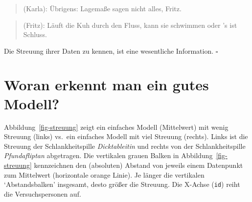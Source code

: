 \documentclass[
  letterpaper,
  twoside,
  open=any]{scrbook}
\theoremstyle{definition}
\theoremstyle{definition}
\theoremstyle{definition}
\theoremstyle{remark}
\begin{document}
\begin{quote}
{} (Karla): Übrigens: Lagemaße sagen nicht alles,
Fritz.
\end{quote}

\begin{quote}
{} (Fritz): Läuft die Kuh durch den Fluss, kann sie
schwimmen oder 's ist Schluss.
\end{quote}

\begin{tcolorbox}[enhanced jigsaw, colframe=quarto-callout-important-color-frame, arc=.35mm, leftrule=.75mm, bottomtitle=1mm, titlerule=0mm, colbacktitle=quarto-callout-important-color!10!white, breakable, bottomrule=.15mm, colback=white, left=2mm, rightrule=.15mm, opacityback=0, toptitle=1mm, toprule=.15mm, opacitybacktitle=0.6, title=\textcolor{quarto-callout-important-color}{\faExclamation}\hspace{0.5em}{Wichtig}, coltitle=black]

Die Streuung ihrer Daten zu kennen, ist eine wesentliche Information.
\(\square\)

\end{tcolorbox}

\section{Woran erkennt man ein gutes
Modell?}\label{woran-erkennt-man-ein-gutes-modell}

Abbildung~\ref{fig-streuung} zeigt ein einfaches Modell (Mittelwert) mit
wenig Streuung (links) vs.~ein einfaches Modell mit viel Streuung
(rechts). Links ist die Streuung der Schlankheitspille
\emph{Dicktableitin} und rechts von der Schlankheitspille
\emph{Pfundafliptan} abgetragen. Die vertikalen grauen Balken in
Abbildung~\ref{fig-streuung} kennzeichnen den (absoluten) Abstand von
jeweils einem Datenpunkt zum Mittelwert (horizontale orange Linie). Je
länger die vertikalen \enquote*{Abstandsbalken} insgesamt, desto größer
die Streuung. Die X-Achse (\texttt{id}) reiht die Versuchspersonen auf.
\end{document}
